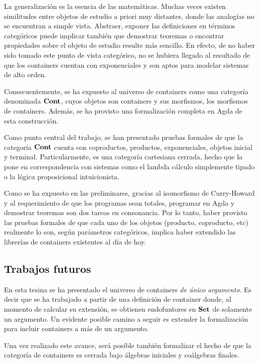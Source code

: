 La generalización es la esencia de las matemáticas. Muchas veces existen similitudes entre objetos de estudio a priori muy distantes, donde las analogías no se encuentran a simple vista. Abstraer, exponer las definiciones en términos categóricos puede implicar también que demostrar teoremas o encontrar propiedades sobre el objeto de estudio resulte más sencillo. En efecto, de no haber sido tomado este punto de vista categórico, no se hubiera llegado al resultado de que los containers cuentan con exponenciales y son aptos para modelar sistemas de alto orden. 

Consecuentemente, se ha expuesto al universo de containers como una categoría denominada $\mathbf{Cont}$, cuyos objetos son containers y sus morfismos, los morfismos de containers. Además, se ha provisto una formalización completa en Agda de esta construcción.

Como punto central del trabajo, se han presentado pruebas formales de que la categoría $\mathbf{Cont}$ cuenta con coproductos, productos, exponenciales, objetos inicial y terminal. 
Particularmente, es una categoría cartesiana cerrada, hecho que la pone en correspondencia con sistemas como el lambda cálculo simplemente tipado o la lógica proposicional intuicionista.

Como se ha expuesto en las preliminares, gracias al isomorfismo de Curry-Howard y al requerimiento de que los programas sean totales, programar en Agda y demostrar teoremas son dos tareas en consonancia. Por lo tanto, haber provisto las pruebas formales de que cada uno de los objetos (producto, coproducto, etc) realmente lo son, según parámetros categóricos, implica haber extendido las librerías de containers existentes al día de hoy.


\subsection*{Trabajos futuros}

En esta tesina se ha presentado el universo de containers {\it de único argumento}. Es decir que se ha trabajado a partir de una definición de container donde, al momento de calcular su extensión, se obtienen endofuntores en $\mathbf{Set}$ de solamente un argumento. Un evidente posible camino a seguir es extender la formalización para incluir containers a más de un argumento.  

Una vez realizado este avance, será posible también formalizar el hecho de que la categoría de containers es cerrada bajo álgebras iniciales y coálgebras finales.

